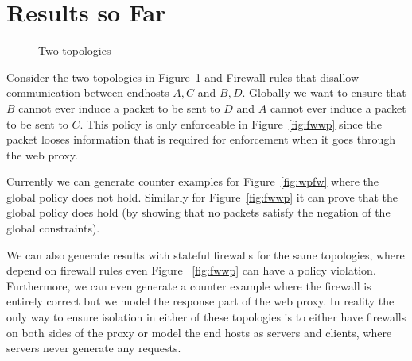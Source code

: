 \documentclass[11pt]{article}
\begin{document}
\section{Results so Far}
\begin{figure}[!h]
\begin{center}
\caption{Two topologies}
\label{fig:topologies}
\end{center}
\end{figure}
Consider the two topologies in Figure~\ref{fig:topologies} and Firewall rules that disallow communication between
endhosts $A, C$ and $B, D$. Globally we want to ensure that $B$ cannot ever induce a packet to be sent to $D$ and $A$
cannot ever induce a packet to be sent to $C$. This policy is only enforceable in Figure~\ref{fig:fwwp} since the packet
looses information that is required for enforcement when it goes through the web proxy.

Currently we can generate counter examples for Figure~\ref{fig:wpfw} where the global policy does
not hold. Similarly for Figure~\ref{fig:fwwp} it can prove that the global policy does hold (by showing that no packets
satisfy the negation of the global constraints). 

We can also generate results with stateful firewalls for the same topologies, where depend on firewall rules even Figure
~\ref{fig:fwwp} can have a policy violation. Furthermore, we can even generate a counter example where the firewall is entirely 
correct but we model the response part of the web proxy. In reality the only way to ensure isolation in either of these
topologies is to either have firewalls on both sides of the proxy or model the end hosts as servers and clients, where servers
never generate any requests.
\end{document}
